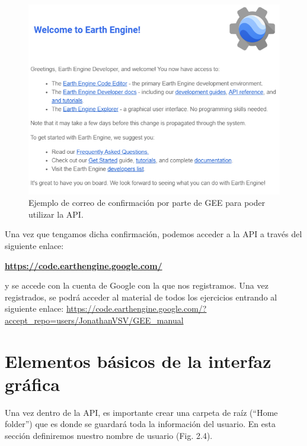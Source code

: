 \documentclass[
  12pt,
  letterpaper,
  twoside]{book}
\begin{document}
\begin{figure}[btp]

{\centering \includegraphics[width=0.6\linewidth]{Img/correo} 

}

\caption{Ejemplo de correo de confirmación por parte de GEE para poder utilizar la API.}\label{fig:unnamed-chunk-4}
\end{figure}

Una vez que tengamos dicha confirmación, podemos acceder a la API a través del siguiente enlace:

\textbf{\url{https://code.earthengine.google.com/}}

y se accede con la cuenta de Google con la que nos registramos.
Una vez registrados, se podrá acceder al material de todos los ejercicios entrando al siguiente enlace: \url{https://code.earthengine.google.com/?accept_repo=users/JonathanVSV/GEE_manual}

\hypertarget{elementos-buxe1sicos-de-la-interfaz-gruxe1fica}{%
\section{Elementos básicos de la interfaz gráfica}\label{elementos-buxe1sicos-de-la-interfaz-gruxe1fica}}

Una vez dentro de la API, es importante crear una carpeta de raíz (``Home folder'') que es donde se guardará toda la información del usuario. En esta sección definiremos nuestro nombre de usuario (Fig. 2.4).
\end{document}
